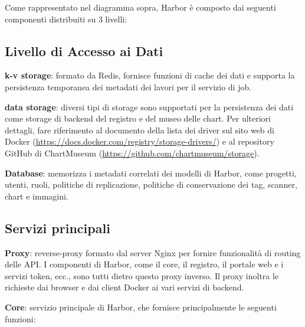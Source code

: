\documentclass[12pt]{report}
\begin{document}
Come rappresentato nel diagramma sopra, Harbor è composto dai seguenti componenti distribuiti su 3 livelli:

\subsection{Livello di Accesso ai Dati}

\textbf{k-v storage}: formato da Redis, fornisce funzioni di cache dei dati e supporta la persistenza temporanea dei metadati dei lavori per il servizio di job.

\textbf{data storage}: diversi tipi di storage sono supportati per la persistenza dei dati come storage di backend del registro e del museo delle chart. Per ulteriori dettagli, fare riferimento al documento della lista dei driver sul sito web di Docker (\url{https://docs.docker.com/registry/storage-drivers/}) e al repository GitHub di ChartMuseum (\url{https://github.com/chartmuseum/storage}).

\textbf{Database}: memorizza i metadati correlati dei modelli di Harbor, come progetti, utenti, ruoli, politiche di replicazione, politiche di conservazione dei tag, scanner, chart e immagini.

\subsection{Servizi principali}

\textbf{Proxy}: reverse-proxy formato dal server Nginx per fornire funzionalità di routing delle API. I componenti di Harbor, come il core, il registro, il portale web e i servizi token, ecc., sono tutti dietro questo proxy inverso. Il proxy inoltra le richieste dai browser e dai client Docker ai vari servizi di backend.

\textbf{Core}: servizio principale di Harbor, che fornisce principalmente le seguenti funzioni:
\end{document}
